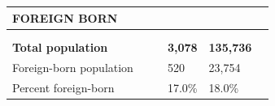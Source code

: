 \documentclass[9pt]{report}
\begin{document}
\newpage
\setlength{\tabcolsep}{.01in} %
\begin{tabular}{p{.10in}p{.10in}p{.10in}p{3.7in}>{\hfill}p{.85in}>{\hfill}p{.85in}>{\hfill}p{.85in}>{\hfill}p{.85in}p{0.1in}}
\multicolumn{9}{l}{\parbox{7.1in}{\raggedright{\large{\strut\textbf{FOREIGN BORN}\strut}}}} \\ 
\hline
\multicolumn{4}{l}{\parbox{3.5in}{\raggedright{\textbf{}}}} & \multicolumn{1}{r}{\parbox{.85in}{\strut\raggedleft{\textbf{}\strut}}} & \multicolumn{1}{r}{\parbox{.85in}{\strut\raggedleft{\textbf{}\strut}}} & \multicolumn{1}{r}{\parbox{.85in}{\strut{}}} & \multicolumn{1}{r}{\parbox{.85in}{\strut{}}} & \\ 
\multicolumn{9}{l}{} \\ 
\multicolumn{4}{l}{\parbox{3.5in}{\strut\raggedright{\textbf{Total population}\strut}}} & \textbf{} & \textbf{} & \textbf{3,078} & \textbf{135,736} & \textbf{} \\ 
\multicolumn{4}{l}{\parbox{3.6in}{\strut\raggedright{{Foreign-born population}}\strut}} &  &  & 520 & 23,754 & \multicolumn{1}{l}{}  \\ 
\multicolumn{4}{l}{\parbox{3.6in}{\strut\raggedright{{Percent foreign-born}}\strut}} &  &  & 17.0\% & 18.0\% & \multicolumn{1}{l}{}  \\ 

\end{tabular}
\setlength{\tabcolsep}{6pt} %
\end{document}
